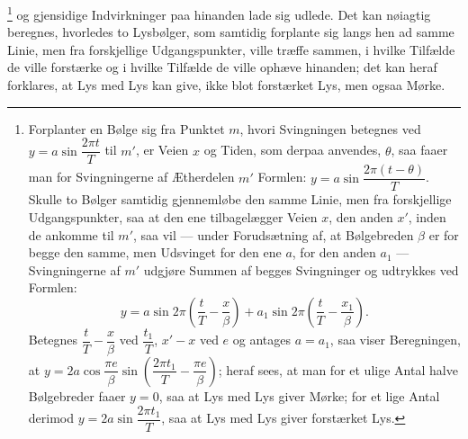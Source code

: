 \documentclass[12pt,a4paper]{book}
\begin{document}
\footnote{%
Forplanter en Bølge sig fra Punktet $m$, hvori Svingningen betegnes ved
$y = a\sin\dfrac{2\pi t}{T}$ til $m'$, er Veien $x$ og Tiden, som
derpaa anvendes, $\theta$, saa faaer man for Svingningerne af
Ætherdelen $m'$ Formlen: $y = a\sin\dfrac{2\pi(t-\theta)}{T}$.
Skulle to Bølger samtidig gjennemløbe den samme Linie, men fra
forskjellige Udgangspunkter, saa at den ene tilbagelægger Veien $x$,
den anden $x'$, inden de ankomme til $m'$, saa vil --- under
Forudsætning af, at Bølgebreden $\beta$ er for begge den samme, men
Udsvinget for den ene $a$, for den anden $a_{1}$ --- Svingningerne af
$m'$ udgjøre Summen af begges Svingninger og udtrykkes ved Formlen:
\[
y = a\sin 2\pi\left(\frac{t}{T}-\frac{x}{\beta}\right)
  + a_{1}\sin 2\pi\left(\frac{t}{T}-\frac{x_{1}}{\beta}\right).
\]
Betegnes $\dfrac{t}{T}-\dfrac{x}{\beta}$ ved $\dfrac{t_{1}}{T}$,
$x'-x$ ved $e$ og antages $a = a_{1}$, saa viser Beregningen, at
$y = 2a\cos\dfrac{\pi e}{\beta}
 \sin\left(\dfrac{2\pi t_{1}}{T}-\dfrac{\pi e}{\beta}\right)$;
heraf sees, at man for et ulige Antal halve Bølgebreder faaer
$y = 0$, saa at Lys med Lys giver Mørke; for et lige Antal derimod
$y = 2a\sin\dfrac{2\pi t_{1}}{T}$, saa at Lys med Lys giver forstærket
Lys.}
og gjensidige Indvirkninger paa hinanden lade sig udlede. Det kan
nøiagtig beregnes, hvorledes to Lysbølger, som samtidig forplante sig
langs hen ad samme Linie, men fra forskjellige Udgangspunkter, ville
træffe sammen, i hvilke Tilfælde de ville forstærke og i hvilke
Tilfælde de ville ophæve hinanden; det kan heraf forklares, at Lys med
Lys kan give, ikke blot forstærket Lys, men ogsaa Mørke.
\end{document}
